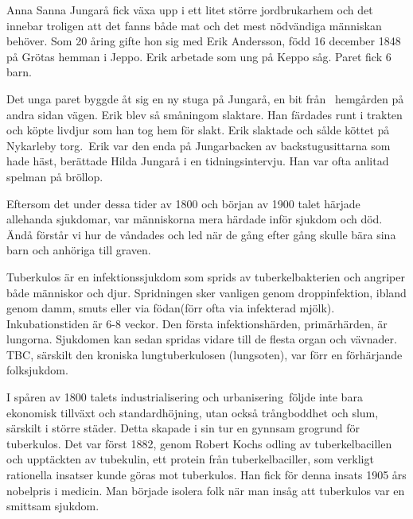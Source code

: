 Anna Sanna Jungarå fick växa upp i ett litet större jordbrukarhem och det innebar troligen att det fanns både mat och det mest nödvändiga människan behöver. Som 20 åring gifte hon sig med Erik Andersson, född 16 december 1848 på Grötas hemman i Jeppo. Erik arbetade som ung på Keppo såg. Paret fick 6 barn.
\begin{jhchildren}
  \item {}
  \item {}
  \item {}
  \item {}
  \item {}
  \item {}
\end{jhchildren}
Det unga paret byggde åt sig en ny stuga på Jungarå, en bit från  hemgården på andra sidan vägen. Erik blev så småningom slaktare. Han färdades runt i trakten och köpte livdjur som han tog hem för slakt. Erik slaktade och sålde köttet på Nykarleby torg. Erik var den enda på Jungarbacken av backstugusittarna som hade häst, berättade Hilda Jungarå i en tidningsintervju. Han var ofta anlitad spelman på bröllop.

Eftersom det under dessa tider av 1800 och början av 1900 talet härjade allehanda sjukdomar, var människorna mera härdade inför sjukdom och död. Ändå förstår vi hur de våndades och led när de gång efter gång skulle bära sina barn och anhöriga till graven.



Tuberkulos är en infektionssjukdom som sprids av tuberkelbakterien och angriper både människor och djur. Spridningen sker vanligen genom droppinfektion, ibland genom damm, smuts eller via födan(förr ofta via infekterad mjölk). Inkubationstiden är 6-8 veckor. Den första infektionshärden, primärhärden, är lungorna. Sjukdomen kan sedan spridas vidare till de flesta organ och vävnader. TBC, särskilt den kroniska lungtuberkulosen (lungsoten), var förr en förhärjande folksjukdom.

I spåren av 1800 talets industrialisering och urbanisering följde inte bara ekonomisk tillväxt och standardhöjning, utan också trångboddhet och slum, särskilt i större städer. Detta skapade i sin tur en gynnsam grogrund för tuberkulos. Det var först 1882, genom Robert Kochs odling av tuberkelbacillen och upptäckten av tubekulin, ett protein från tuberkelbaciller, som verkligt rationella insatser kunde göras mot tuberkulos. Han fick för denna insats 1905 års nobelpris i medicin. Man började isolera folk när man insåg att tuberkulos var en smittsam sjukdom.

